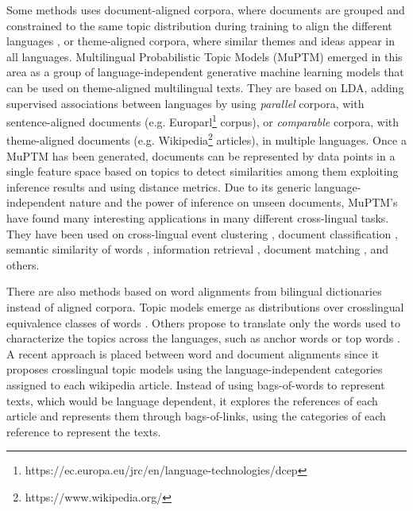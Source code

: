 Some methods uses document-aligned corpora, where documents are grouped and constrained to the same topic distribution during training to align the different languages \citep{mimno-etal-2009-polylingual, Ni2009, Fukumasu2012, Zhang2013}, or theme-aligned corpora, where similar themes and ideas appear in all languages\citep{Graber2009}. Multilingual Probabilistic Topic Models (MuPTM) \citep{Vulic2015} emerged in this area as a group of language-independent generative machine learning models that can be used on theme-aligned multilingual texts. They are based on LDA, adding supervised associations between languages by using \textit{parallel} corpora, with sentence-aligned documents (e.g. Europarl\footnote{https://ec.europa.eu/jrc/en/language-technologies/dcep} corpus), or \textit{comparable} corpora, with theme-aligned documents (e.g. Wikipedia\footnote{https://www.wikipedia.org/} articles), in multiple languages. Once a MuPTM has been generated, documents can be represented by data points in a single feature space based on topics to detect similarities among them exploiting inference results and using distance metrics. Due to its generic language-independent nature and the power of inference on unseen documents, MuPTM's have found many interesting applications in many different cross-lingual tasks. They have been used on cross-lingual event clustering \citep{Smet2009}, document classification \citep{10.1007/978-3-642-20841-6_45, Ni:2011:CLT:1935826.1935887},  semantic similarity of words \citep{mimno-etal-2009-polylingual, Vulic:2012:DHC:2380816.2380872}, information retrieval \citep{10.1007/978-3-642-36973-5_9, ganguly-etal-2012-cross}, document matching \citep{Platt:2010:TDR:1870658.1870683, zhu-etal-2013-building}, and others. 

There are also methods based on word alignments from bilingual dictionaries instead of aligned corpora. Topic models emerge as distributions over crosslingual equivalence classes of words \citep{Jagarlamudi2010, zhang-etal-2010-cross, shi-etal-2016-detecting, hao-paul-2018-learning}. Others propose to translate only the words used to characterize the topics across the languages, such as anchor words \citep{NEURIPS2018_28b9f8aa} or top words \citep{yang2019multilingual}. A recent approach is placed between word and document alignments since it proposes crosslingual topic models using the language-independent categories assigned to each wikipedia article\citep{2020arXiv200911207P}. Instead of using bags-of-words to represent texts, which would be language dependent, it explores the references of each article and represents them through bags-of-links, using the categories of each reference to represent the texts.

